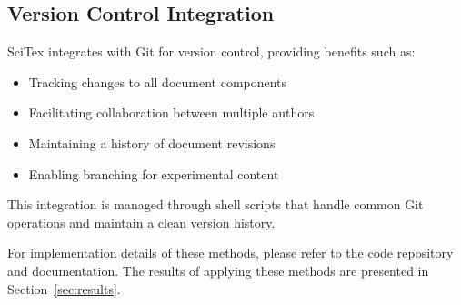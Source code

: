 \subsection{Version Control Integration}
\label{subsec:version-control}

SciTex integrates with Git for version control, providing benefits such as:

\begin{itemize}
    \item Tracking changes to all document components
    \item Facilitating collaboration between multiple authors
    \item Maintaining a history of document revisions
    \item Enabling branching for experimental content
\end{itemize}

This integration is managed through shell scripts that handle common Git operations and maintain a clean version history.


For implementation details of these methods, please refer to the code repository and documentation. The results of applying these methods are presented in Section~\ref{sec:results}.

